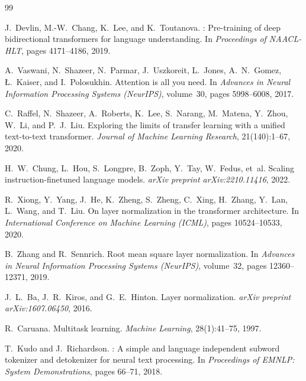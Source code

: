 \documentclass[11pt,a4paper]{article}
\begin{document}


\begin{thebibliography}{99}

J.~Devlin, M.-W.~Chang, K.~Lee, and K.~Toutanova.
: Pre-training of deep bidirectional transformers for language understanding.
\newblock In \emph{Proceedings of NAACL-HLT}, pages 4171--4186, 2019.

A.~Vaswani, N.~Shazeer, N.~Parmar, J.~Uszkoreit, L.~Jones, A.~N.~Gomez, {\L}.~Kaiser, and I.~Polosukhin.
\newblock Attention is all you need.
\newblock In \emph{Advances in Neural Information Processing Systems (NeurIPS)}, volume~30, pages 5998--6008, 2017.

C.~Raffel, N.~Shazeer, A.~Roberts, K.~Lee, S.~Narang, M.~Matena, Y.~Zhou, W.~Li, and P.~J.~Liu.
\newblock Exploring the limits of transfer learning with a unified text-to-text transformer.
\newblock \emph{Journal of Machine Learning Research}, 21(140):1--67, 2020.

H.~W.~Chung, L.~Hou, S.~Longpre, B.~Zoph, Y.~Tay, W.~Fedus, et~al.
\newblock Scaling instruction-finetuned language models.
\newblock \emph{arXiv preprint arXiv:2210.11416}, 2022.

R.~Xiong, Y.~Yang, J.~He, K.~Zheng, S.~Zheng, C.~Xing, H.~Zhang, Y.~Lan, L.~Wang, and T.~Liu.
\newblock On layer normalization in the transformer architecture.
\newblock In \emph{International Conference on Machine Learning (ICML)}, pages 10524--10533, 2020.

B.~Zhang and R.~Sennrich.
\newblock Root mean square layer normalization.
\newblock In \emph{Advances in Neural Information Processing Systems (NeurIPS)}, volume~32, pages 12360--12371, 2019.

J.~L.~Ba, J.~R.~Kiros, and G.~E.~Hinton.
\newblock Layer normalization.
\newblock \emph{arXiv preprint arXiv:1607.06450}, 2016.

R.~Caruana.
\newblock Multitask learning.
\newblock \emph{Machine Learning}, 28(1):41--75, 1997.

T.~Kudo and J.~Richardson.
: A simple and language independent subword tokenizer and detokenizer for neural text processing.
\newblock In \emph{Proceedings of EMNLP: System Demonstrations}, pages 66--71, 2018.


\end{thebibliography}
\end{document}
